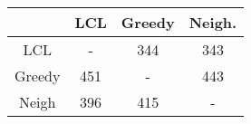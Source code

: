 \begin{tabular}{| c | c | c | c | }
	\hline
	& LCL & Greedy & Neigh. \\
	\hline
	LCL& - & 344 & 343\\
	\hline
	Greedy & 451& - & 443\\
	\hline
	Neigh & 396 & 415& - \\
	\hline
\end{tabular}
